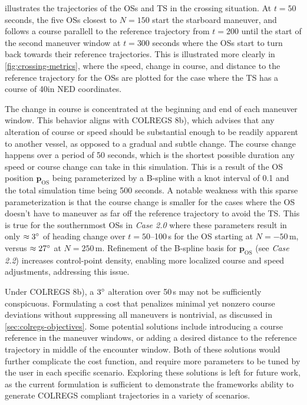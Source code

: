  illustrates the trajectories of the OSs and TS in the crossing situation. At $t=50$ seconds, the five OSs closest to $N=150$ start the starboard maneuver, and follows a course parallell to the reference trajectory from $t=200$ until the start of the second maneuver window at $t=300$ seconds where the OSs start to turn back towards their reference trajectories. This is illustrated more clearly in \cref{fig:crossing-metrics}, where the speed, change in course, and distance to the reference trajectory for the OSs are plotted for the case where the TS has a course of 40\degree in \gls{NED} coordinates.

The change in course is concentrated at the beginning and end of each maneuver window. This behavior aligns with COLREGS 8b), which advises that any alteration of course or speed should be substantial enough to be readily apparent to another vessel, as opposed to a gradual and subtle change.  The course change happens over a period of 50 seconds, which is the shortest possible duration any speed or course change can take in this simulation. This is a result of the OS position $\mathbf p_\text{OS}$ being parameterized by a B-spline with a knot interval of 0.1 and the total simulation time being 500 seconds. A notable weakness with this sparse parameterization is that the course change is smaller for the cases where the OS doesn't have to maneuver as far off the reference trajectory to avoid the TS. 
This is true for the southernmost OSs in \emph{Case 2.0} where these parameters result in only $\approx3\degree$ of heading change over $t=50$–100\,s for the OS starting at $N=-50\,$m, versus $\approx27\degree$ at $N=250\,$m. Refinement of the B-spline basis for $\mathbf p_\text{OS}$ (see \emph{Case 2.2}) increases control-point density, enabling more localized course and speed adjustments, addressing this issue.

Under COLREGS 8b), a $3\degree$ alteration over 50\,s may not be sufficiently conspicuous. Formulating a cost that penalizes minimal yet nonzero course deviations without suppressing all maneuvers is nontrivial, as discussed in \cref{sec:colregs-objectives}. Some potential solutions include introducing a course reference in the maneuver windows, or adding a desired distance to the reference trajectory in middle of the encounter window. Both of these solutions would further complicate the cost function, and require more parameters to be tuned by the user in each specific scenario. Exploring these solutions is left for future work, as the current formulation is sufficient to demonstrate the frameworks ability to generate COLREGS compliant trajectories in a variety of scenarios.


